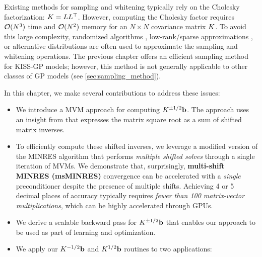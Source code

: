 Existing methods for sampling and whitening
typically rely on the Cholesky factorization: $K = L L^\top$.
However, computing the Cholesky factor requires $\bigo{N^3}$ time and $\bigo{N^2}$ memory for an $N \times N$ covariance matrix $K$.
To avoid this large complexity, randomized algorithms \cite{rahimi2008random,mutny2018efficient}, low-rank/sparse approximations \cite{hensman2017variational,wilson2020efficiently}, or alternative distributions \citep{wang2017max} are often used to approximate the sampling and whitening operations.
The previous chapter offers an efficient sampling method for KISS-GP models; however, this method is not generally applicable to other classes of GP models (see \cref{sec:sampling_method}).

In this chapter, we make several contributions to address these issues:
%
\begin{itemize}
  \item We introduce a MVM approach for computing $K^{\pm 1 / 2} \mathbf{b}$.
    The approach uses an insight from \citet{hale2008computing} that expresses the matrix square root as a sum of shifted matrix inverses.

  \item To efficiently compute these shifted inverses, we leverage a modified version of the MINRES algorithm \cite{paige1975solution} that performs \emph{multiple shifted solves} through a single iteration of MVMs.
    We demonstrate that, surprisingly, {\bf multi-shift MINRES (msMINRES)} convergence can be accelerated with a \emph{single} preconditioner despite the presence of multiple shifts.
    Achieving 4 or 5 decimal places of accuracy typically requires \emph{fewer than 100 matrix-vector multiplications}, which can be highly accelerated through GPUs.

  \item We derive a scalable backward pass for $K^{\pm 1/2} \mathbf{b}$  that enables our approach to be used as part of learning and optimization.

  \item We apply our $K^{-1/2} \mathbf{b}$ and $K^{1/2} \mathbf{b}$ routines to two applications:
\end{itemize}
